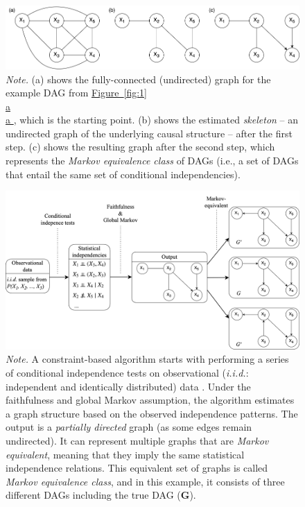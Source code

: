\documentclass[twoside, 11pt]{article}
\newcommand*{\figref}[2][]{%
  \hyperref[{fig:#2}]{%
    Figure~\ref*{fig:#2}%
    \ifx\\#1\\%
    \else
      #1%
    \fi
  }%
}
\begin{document}
\begin{figure}[t]
    \centering
        \caption{Steps of a constraint-based method.}
        \includegraphics[width=1.0\textwidth]{figures/constraintstep.png}
        \vspace{-1mm}
        \caption*{\small{\textit{Note.} (a) shows the fully-connected (undirected) graph for the example DAG from \figref[a]{1}, which is the starting point. (b) shows the estimated \textit{skeleton} -- an undirected graph of the underlying causal structure -- after the first step. (c) shows the resulting graph after the second step, which represents the \textit{Markov equivalence class} of DAGs (i.e., a set of DAGs that entail the same set of conditional independencies).}}
    \label{fig:2}
\end{figure}

\vspace*{3mm}

\begin{figure}[H]
    \centering
        \caption{Summary of the constraint-based causal discovery procedure.}
        \includegraphics[width=1.0\textwidth]{figures/CB_summaryedited2.png}
        \vspace{-2mm}
        \caption*{\small{\textit{Note.} A constraint-based algorithm starts with performing a series of conditional independence tests on observational (\textit{i.i.d.}: independent and identically distributed) data . Under the faithfulness and global Markov assumption, the algorithm estimates a graph structure based on the observed independence patterns. The output is a \textit{partially directed} graph (as some edges remain undirected). It can represent multiple graphs that are \textit{Markov equivalent}, meaning that they imply the same statistical independence relations. This equivalent set of graphs is called \textit{Markov equivalence class}, and in this example, it consists of three different DAGs including the true DAG ($\boldsymbol{G}$).}}
    \label{fig:3}
\end{figure}
\end{document}
